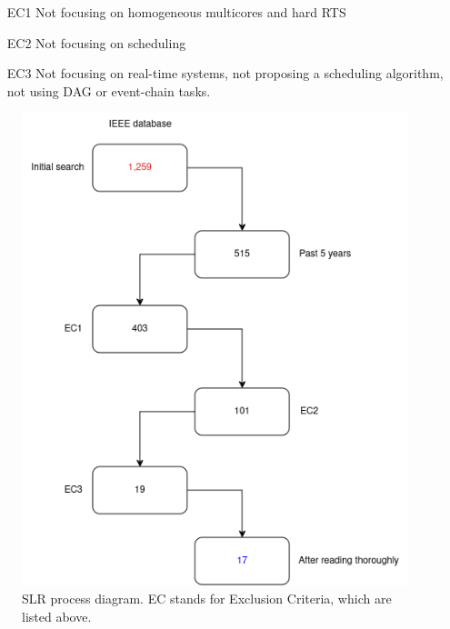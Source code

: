 \begin{itemize}{}{}
    \item [EC1] Not focusing on homogeneous multicores and hard RTS
    
    \item [EC2] Not focusing on scheduling

    \item [EC3] Not focusing on real-time systems, not proposing a scheduling algorithm, not using DAG or event-chain tasks.
\end{itemize}

\begin{figure}[htbp]
    \centering
    \includegraphics[width=\linewidth]{images/slr_process.png}
    \caption{SLR process diagram. EC stands for Exclusion Criteria,
    which are listed above.}
    \label{fig:slr_process}
\end{figure}


